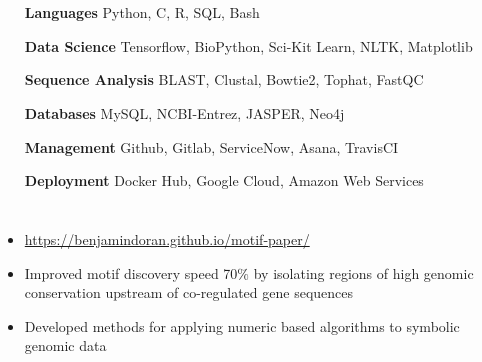 \documentclass[hidelinks, 11pt]{article}
\begin{document}
\section*{}
\begin{addmargin}{1.7in}
  \begin{itemize}\setlength\itemsep{-4pt}
    \item[{\bf Languages}]{Python, C, R, SQL, Bash}
    \item[{\bf Data Science}]{Tensorflow, BioPython, Sci-Kit Learn, NLTK, Matplotlib }
    \item[{\bf Sequence Analysis}]{BLAST, Clustal, Bowtie2, Tophat, FastQC}
    \item[{\bf Databases}]{MySQL, NCBI-Entrez, JASPER, Neo4j}
    \item[{\bf Management}]{Github, Gitlab, ServiceNow, Asana, TravisCI}
    \item[{\bf Deployment}]{Docker Hub, Google Cloud, Amazon Web Services}
  \end{itemize}
\end{addmargin}
\vspace{-6pt}

\section*{}
\begin{addmargin}{.5in}
  \begin{itemize}\setlength\itemsep{-4pt}
    \item{\color{blue}\url{https://benjamindoran.github.io/motif-paper/}}
    \item{Improved motif discovery speed 70$\%$ by isolating regions of high genomic conservation upstream of co-regulated gene sequences} 
    \item{Developed methods for applying numeric based algorithms to symbolic genomic data}
  \end{itemize}
\end{addmargin}
\vspace{-6pt}

\end{document}
